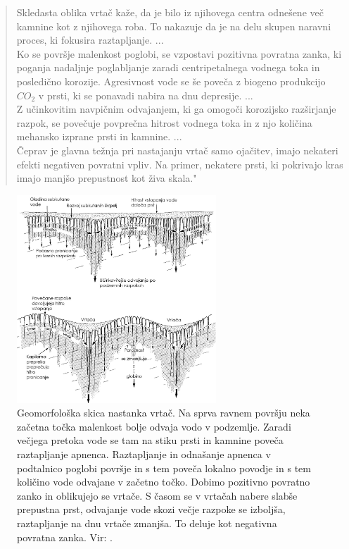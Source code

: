 \documentclass[a4paper, twoside, 12pt]{book}
\begin{document}
\begin{quotation}
Skledasta oblika vrtač kaže, da je bilo iz njihovega centra odnešene več kamnine kot z njihovega roba. To nakazuje da je na delu skupen naravni proces, ki fokusira raztapljanje. ... \\
Ko se površje malenkost poglobi, se vzpostavi pozitivna povratna zanka, ki poganja nadaljnje poglabljanje zaradi centripetalnega vodnega toka in posledično korozije. Agresivnost vode se še poveča z biogeno produkcijo $CO_2$ v prsti, ki se ponavadi nabira na dnu depresije. ... \\
Z učinkovitim navpičnim odvajanjem, ki ga omogoči korozijsko razširjanje razpok, se povečuje povprečna hitrost vodnega toka in z njo količina mehansko izprane prsti in kamnine. ... \\
Čeprav je glavna težnja pri nastajanju vrtač samo ojačitev, imajo nekateri efekti negativen povratni vpliv. Na primer, nekatere prsti, ki pokrivajo kras imajo manjšo prepustnost kot živa skala."
\end{quotation}
\begin{figure}[h!]
  \begin{center}
    \includegraphics[width=7.5cm]{slike/vrtaca-ford-williams.jpg}
  \end{center}
  \caption{Geomorfološka skica nastanka vrtač. Na sprva ravnem površju neka začetna točka malenkost bolje odvaja vodo v podzemlje. Zaradi večjega pretoka vode se tam na stiku prsti in kamnine poveča raztapljanje apnenca. Raztapljanje in odnašanje apnenca v podtalnico poglobi površje in s tem poveča lokalno povodje in s tem količino vode odvajane v začetno točko. Dobimo pozitivno povratno zanko in oblikujejo se vrtače. S časom se v vrtačah nabere slabše prepustna prst, odvajanje vode skozi večje razpoke se izboljša, raztapljanje na dnu vrtače zmanjša. To deluje kot negativna povratna zanka. Vir: \cite{ford2007karst}.}
\label{fig:vrtaca-ford-williams}
\end{figure}
\end{document}
